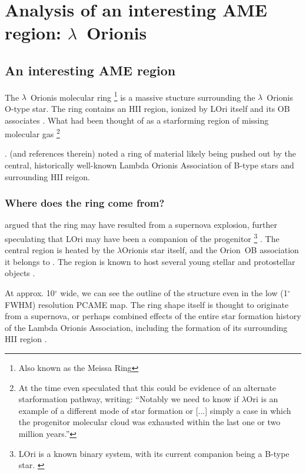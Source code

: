 \chapter{Analysis of an interesting AME region: $\lambda$~Orionis}

 \section{An interesting AME region}
		The $\lambda$~Orionis molecular ring \footnote{Also known as the Meissa Ring} is a massive stucture surrounding the $\lambda$~Orionis O-type star. The ring contains an HII region, ionized by LOri itself and its OB associates \citep{murdin77}. What had been thought of as a star\-forming region of missing molecular gas
    \footnote{At the time \cite{murdin77} even speculated that this could be evidence of an alternate star\-formation pathway, writing: ``Notably we need to know if $\lambda$Ori is an example of a different mode of star formation or [...] simply a case in which the progenitor molecular cloud was exhausted within the last one or two million years.''}

    \cite{maddalena86,maddalena87}.  (and references therein) noted a ring of material likely being pushed out by the central, historically well-known Lambda Orionis Association of B-type stars and surrounding HII reigon.

   \subsection{Where does the ring come from?}
    \cite{cunha96} argued that the ring may have resulted from a supernova explosion, further speculating that LOri may have been a companion of the progenitor
    \footnote{LOri is a known binary system, with its current companion being a B-type star. \citep{murdin77}}
  .
     The central region is heated by the $\lambda$Orionis star itself, and the Orion~OB association it belongs to \citep{ochsendorf15}. The region is known to host several young stellar and protostellar objects \citep{koenig15}.

    At approx. 10$^{\circ}$ wide, we can see the outline of the structure even in the low (1$^{\circ}$ FWHM) resolution PCAME map. The ring shape itself is thought to originate from a supernova, or perhaps combined effects of the entire star formation history of the Lambda Orionis Association, including the formation of its surrounding HII region \citep{aran09}.

